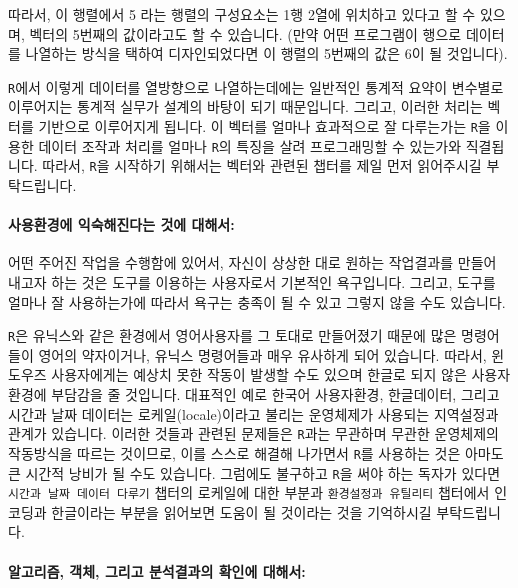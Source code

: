 \documentclass[tutorial.tex]{subfiles}
\begin{document}
따라서, 이 행렬에서 5 라는 행렬의 구성요소는 1행 2열에 위치하고 있다고 할 수 있으며, 벡터의 5번째의 값이라고도 할 수 있습니다. 
(만약 어떤 프로그램이 행으로 데이터를 나열하는 방식을 택하여 디자인되었다면 이 행렬의 5번째의 값은 6이 될 것입니다).

\texttt{R}에서 이렇게 데이터를 열방향으로 나열하는데에는 일반적인 통계적 요약이 변수별로 이루어지는 통계적 실무가 설계의 바탕이 되기 때문입니다.
그리고, 이러한 처리는 벡터를 기반으로 이루어지게 됩니다.  
이 벡터를 얼마나 효과적으로 잘 다루는가는 \texttt{R}을 이용한 데이터 조작과 처리를 얼마나 \texttt{R}의 특징을 살려 프로그래밍할 수 있는가와 직결됩니다. 
따라서, \texttt{R}을 시작하기 위해서는 벡터와 관련된 챕터를 제일 먼저 읽어주시길 부탁드립니다. 


\paragraph{사용환경에 익숙해진다는 것에 대해서:} 

어떤 주어진 작업을 수행함에 있어서, 자신이 상상한 대로 원하는 작업결과를 만들어 내고자 하는 것은 도구를 이용하는 사용자로서 기본적인 욕구입니다. 
그리고, 도구를 얼마나 잘 사용하는가에 따라서 욕구는 충족이 될 수 있고 그렇지 않을 수도 있습니다.

\texttt{R}은 유닉스와 같은 환경에서 영어사용자를 그 토대로 만들어졌기 때문에 많은 명령어들이 영어의 약자이거나, 유닉스 명령어들과 매우 유사하게 되어 있습니다.
따라서, 윈도우즈 사용자에게는 예상치 못한 작동이 발생할 수도 있으며 한글로 되지 않은 사용자 환경에 부담감을 줄 것입니다.
대표적인 예로 한국어 사용자환경, 한글데이터, 그리고 시간과 날짜 데이터는 로케일(locale)이라고 불리는 운영체제가 사용되는 지역설정과 관계가 있습니다. 
이러한 것들과 관련된 문제들은 \texttt{R}과는 무관하며 무관한 운영체제의 작동방식을 따르는 것이므로, 이를 스스로 해결해 나가면서 \texttt{R}를 사용하는 것은 아마도 큰 시간적 낭비가 될 수도 있습니다.
그럼에도 불구하고 \texttt{R}을 써야 하는 독자가 있다면 \texttt{시간과 날짜 데이터 다루기} 챕터의 로케일에 대한 부분과 \texttt{환경설정과 유틸리티} 챕터에서 인코딩과 한글이라는 부분을 읽어보면 도움이 될 것이라는 것을 기억하시길 부탁드립니다.


\paragraph{알고리즘, 객체, 그리고 분석결과의 확인에 대해서:} 
\end{document}
